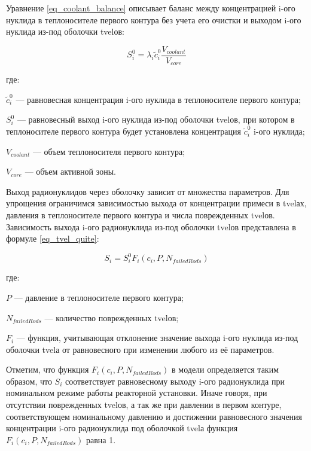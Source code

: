Уравнение \ref{eq_coolant_balance} описывает баланс между концентрацией i-ого нуклида в теплоносителе первого контура 
без учета его очистки и выходом i-ого нуклида из-под оболочки \ac{tvel}ов:

\begin{equation}
    \label{eq_coolant_balance}
    S_{i}^{0} = \lambda_{i}\widetilde{c}_{i}^{0}\frac{V_{coolant}}{V_{core}}
\end{equation}

где:
\begin{description}
    \item $\widetilde{c}_{i}^{0}$ --- равновесная концентрация i-ого нуклида в теплоносителе первого контура;
    \item $S_{i}^{0}$ --- равновесный выход i-ого нуклида из-под оболочки \ac{tvel}ов, при котором в 
        теплоносителе первого контура будет установлена концентрация $\widetilde{c}_{i}^{0}$ i-ого нуклида;
    \item $V_{coolant}$ --- объем теплоносителя первого контура;
    \item $V_{core}$ --- объем активной зоны.
\end{description}

Выход радионуклидов через оболочку зависит от множества параметров. Для упрощения ограничимся зависимостью выхода от 
концентрации примеси в \ac{tvel}ах, давления в теплоносителе первого контура и числа поврежден­ных \ac{tvel}ов. 
Зависимость выхода i-ого радионуклида из-под оболочки \ac{tvel}ов представлена в формуле \ref{eq_tvel_quite}:

\begin{equation}
    \label{eq_tvel_quite}
    S_{i} = S_{i}^{0}F_{i}(c_{i}, P, N_{failedRods})
\end{equation}

где:
\begin{description}
    \item $P$ --- давление в теплоносителе первого контура;
    \item $N_{failedRods}$ --- количество поврежденных \ac{tvel}ов;
    \item $F_{i}$ --- функция, учитывающая отклонение значение выхода i-ого нуклида из-под оболочки \ac{tvel}а от 
        равновесного при изменении любого из её параметров.
\end{description}

Отметим, что функция $F_{i}(c_{i}, P, N_{failedRods})$ в модели определяется таким образом, что $S_{i}$ соответствует 
равновесному выходу i-ого радионуклида при номинальном режиме работы реакторной установки. Иначе говоря, при отсутствии 
поврежденных \ac{tvel}ов, а так же при давлении в первом контуре, соответствующем номинальному давлению и достижении 
равновесного значения концентрации i-ого радионуклида под оболочкой \ac{tvel}а функция $F_{i}(c_{i}, P, N_{failedRods})$ 
равна 1.

